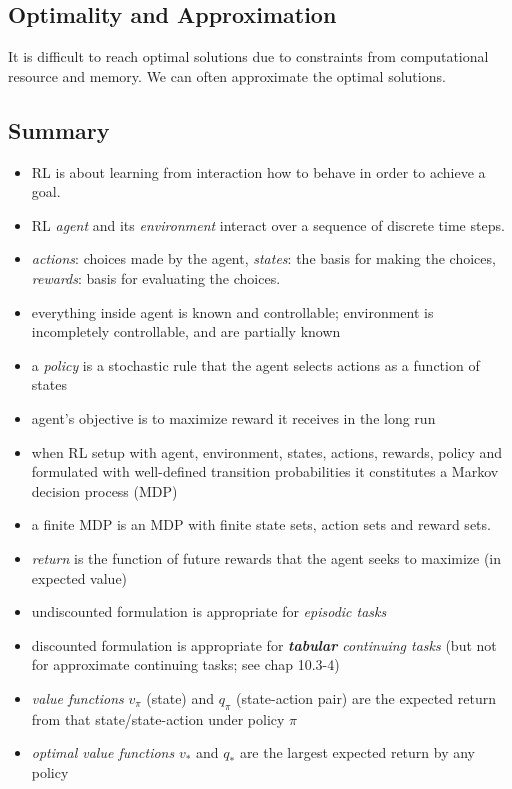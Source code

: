 \documentclass[sutton_barto_notes.tex]{subfiles}
\begin{document}
\subsection{Optimality and Approximation}

It is difficult to reach optimal solutions due to constraints from computational resource and memory. We can often approximate the optimal solutions.

\subsection{Summary}

\begin{itemize}
\item RL is about learning from interaction how to behave in order to achieve a goal.
\item RL \textit{agent} and its \textit{environment} interact over a sequence of discrete time steps.
\item \textit{actions}: choices made by the agent, \textit{states}: the basis for making the choices, \textit{rewards}: basis for evaluating the choices.
\item everything inside agent is known and controllable; environment is incompletely controllable, and are partially known
\item a \textit{policy} is a stochastic rule that the agent selects actions as a function of states
\item agent's objective is to maximize reward it receives in the long run
\item when RL setup with agent, environment, states, actions, rewards, policy and formulated with well-defined transition probabilities it constitutes a Markov decision process (MDP)
\item a finite MDP is an MDP with finite state sets, action sets and reward sets.
\item \textit{return} is the function of future rewards that the agent seeks to maximize (in expected value)
\item undiscounted formulation is appropriate for \textit{episodic tasks}
\item discounted formulation is appropriate for \textit{\textbf{tabular} continuing tasks} (but not for approximate continuing tasks; see chap 10.3-4)
\item \textit{value functions} $v_\pi$ (state) and $q_\pi$ (state-action pair) are the expected return from that state/state-action under policy $\pi$
\item \textit{optimal value functions} $v_*$ and $q_*$ are the largest expected return by any policy

\end{itemize}
\end{document}
